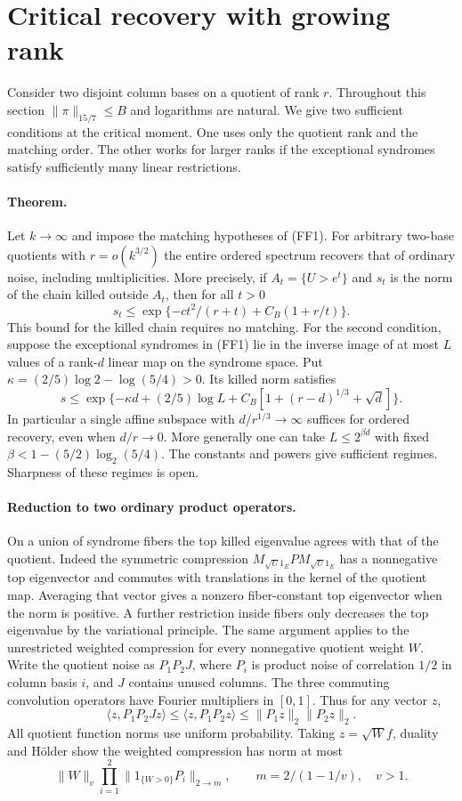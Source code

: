 \section{Critical recovery with growing rank}
\label{sec:critical-rank}
Consider two disjoint column bases on a quotient of rank $r$. Throughout this section $\|\pi\|_{15/7}\le B$ and logarithms are natural. We give two sufficient conditions at the critical moment. One uses only the quotient rank and the matching order. The other works for larger ranks if the exceptional syndromes satisfy sufficiently many linear restrictions.

\paragraph{Theorem.}
Let $k\to\infty$ and impose the matching hypotheses of (FF1). For arbitrary two-base quotients with $r=o(k^{3/2})$ the entire ordered spectrum recovers that of ordinary noise, including multiplicities. More precisely, if $A_t=\{U>e^t\}$ and $s_t$ is the norm of the chain killed outside $A_t$, then for all $t>0$
\[
 s_t\le \exp\{-c t^2/(r+t)+C_B(1+r/t)\}.                  \tag{CR1}
\]
This bound for the killed chain requires no matching. For the second condition, suppose the exceptional syndromes in (FF1) lie in the inverse image of at most $L$ values of a rank-$d$ linear map on the syndrome space. Put $\kappa=(2/5)\log 2-\log(5/4)>0$. Its killed norm satisfies
\[
 s\le \exp\{-\kappa d+(2/5)\log L+
             C_B[1+(r-d)^{1/3}+\sqrt d]\}.                  \tag{CR2}
\]
In particular a single affine subspace with $d/r^{1/3}\to\infty$ suffices for ordered recovery, even when $d/r\to0$. More generally one can take $L\le 2^{\beta d}$ with fixed $\beta<1-(5/2)\log_2(5/4)$. The constants and powers give sufficient regimes. Sharpness of these regimes is open.

\paragraph{Reduction to two ordinary product operators.}
On a union of syndrome fibers the top killed eigenvalue agrees with that of the quotient. Indeed the symmetric compression $M_{\sqrt{U}1_E} P M_{\sqrt{U}1_E}$ has a nonnegative top eigenvector and commutes with translations in the kernel of the quotient map. Averaging that vector gives a nonzero fiber-constant top eigenvector when the norm is positive. A further restriction inside fibers only decreases the top eigenvalue by the variational principle. The same argument applies to the unrestricted weighted compression for every nonnegative quotient weight $W$. Write the quotient noise as $P_1P_2J$, where $P_i$ is product noise of correlation $1/2$ in column basis $i$, and $J$ contains unused columns. The three commuting convolution operators have Fourier multipliers in $[0,1]$. Thus for any vector $z$,
\[
 \langle z,P_1P_2Jz\rangle
 \le\langle z,P_1P_2 z\rangle\le\|P_1z\|_2\|P_2z\|_2 .
\]
All quotient function norms use uniform probability. Taking $z=\sqrt W f$, duality and H\"older show the weighted compression has norm at most
\[
 \|W\|_v\prod_{i=1}^2\|1_{\{W>0\}}P_i\|_{2\to m},
 \qquad m=2/(1-1/v),\quad v>1.                             \tag{CR3}
\]

